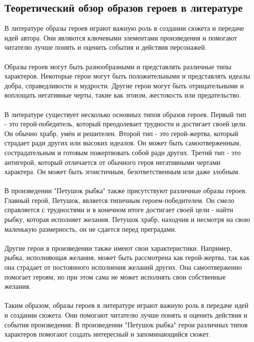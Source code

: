 \documentclass{article}
\begin{document}
\subsection{Теоретический обзор образов героев в литературе}
В литературе образы героев играют важную роль в создании сюжета и передаче идей автора. Они являются ключевыми элементами произведения и помогают читателю лучше понять и оценить события и действия персонажей.\\
~\\
Образы героев могут быть разнообразными и представлять различные типы характеров. Некоторые герои могут быть положительными и представлять идеалы добра, справедливости и мудрости. Другие герои могут быть отрицательными и воплощать негативные черты, такие как эгоизм, жестокость или предательство.\\
~\\
В литературе существует несколько основных типов образов героев. Первый тип - это герой-победитель, который преодолевает трудности и достигает своей цели. Он обычно храбр, умён и решителен. Второй тип - это герой-жертва, который страдает ради других или высоких идеалов. Он может быть самоотверженным, сострадательным и готовым пожертвовать собой ради других. Третий тип - это антигерой, который отличается от обычного героя негативными чертами характера. Он может быть эгоистичным, безответственным или даже злобным.\\
~\\
В произведении "{}{}Петушок рыбка"{}{} также присутствуют различные образы героев. Главный герой, Петушок, является типичным героем-победителем. Он смело справляется с трудностями и в конечном итоге достигает своей цели - найти рыбку, которая исполняет желания. Петушок храбр, находчив и несмотря на свою маленькую размерность, он не сдается перед преградами.\\
~\\
Другие герои в произведении также имеют свои характеристики. Например, рыбка, исполняющая желания, может быть рассмотрена как герой-жертва, так как она страдает от постоянного исполнения желаний других. Она самоотверженно помогает героям, но при этом сама не может исполнять свои собственные желания.\\
~\\
Таким образом, образы героев в литературе играют важную роль в передаче идей и создании сюжета. Они помогают читателю лучше понять и оценить действия и события произведения. В произведении "{}{}Петушок рыбка"{}{} герои различных типов характеров помогают создать интересный и запоминающийся сюжет.
\end{document}
